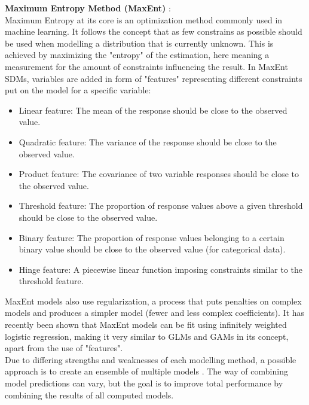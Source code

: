 \documentclass[12pt,a4paper]{article}
\begin{document}
\textbf{Maximum Entropy Method (MaxEnt)} \autocite{phillips2006maxent, phillips2017maxnet}:\\
Maximum Entropy at its core is an optimization method commonly used in machine learning.
It follows the concept that as few constrains as possible should be used when modelling a distribution that is currently unknown.
This is achieved by maximizing the "entropy" of the estimation, here meaning a measurement for the amount of constraints influencing the result.
In MaxEnt SDMs, variables are added in form of "features" representing different constraints put on the model for a specific variable:
\begin{itemize}
    \item Linear feature: The mean of the response should be close to the observed value.
    \item Quadratic feature: The variance of the response should be close to the observed value.
    \item Product feature: The covariance of two variable responses should be close to the observed value.
    \item Threshold feature: The proportion of response values above a given threshold should be close to the observed value.
    \item Binary feature: The proportion of response values belonging to a certain binary value should be close to the observed value (for categorical data).
    \item Hinge feature: A piecewise linear function imposing constraints similar to the threshold feature.
\end{itemize}

MaxEnt models also use regularization, a process that puts penalties on complex models and produces a simpler model (fewer and less complex coefficients).
It has recently been shown that MaxEnt models can be fit using infinitely weighted logistic regression, making it very similar to GLMs and GAMs in its concept, apart from the use of "features".
\\
Due to differing strengths and weaknesses of each modelling method, a possible approach is to create an ensemble of multiple models \autocite{araujo2007ensemble}.
The way of combining model predictions can vary, but the goal is to improve total performance by combining the results of all computed models.
\end{document}
